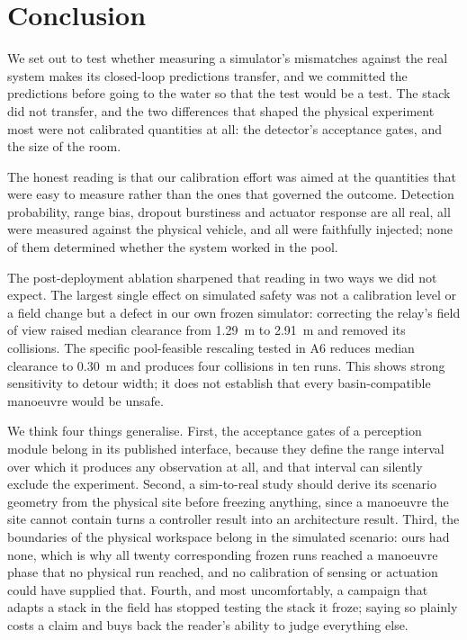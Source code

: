 \section{Conclusion}
\label{sec:conclusion}

We set out to test whether measuring a simulator's mismatches against the
real system makes its closed-loop predictions transfer, and we committed
the predictions before going to the water so that the test would be a
test. The stack did not transfer, and the two differences that shaped the
physical experiment most were not calibrated quantities at all: the
detector's acceptance gates, and the size of the room.

The honest reading is that our calibration effort was aimed at the
quantities that were easy to measure rather than the ones that governed
the outcome. Detection probability, range bias, dropout burstiness and
actuator response are all real, all were measured against the physical
vehicle, and all were faithfully injected; none of them determined
whether the system worked in the pool.

The post-deployment ablation sharpened that reading in two ways we did
not expect. The largest single effect on simulated safety was not a
calibration level or a field change but a defect in our own frozen
simulator: correcting the relay's field of view raised median clearance
from \SI{1.29}{\metre} to \SI{2.91}{\metre} and removed its collisions.
The specific pool-feasible rescaling tested in A6 reduces median
clearance to \SI{0.30}{\metre} and produces four collisions in ten runs.
This shows strong sensitivity to detour width; it does not establish
that every basin-compatible manoeuvre would be unsafe.

We think four things generalise. First, the acceptance gates of a
perception module belong in its published interface, because they define
the range interval over which it produces any observation at all, and
that interval can silently exclude the experiment. Second, a sim-to-real
study should derive its scenario geometry from the physical site before
freezing anything, since a manoeuvre the site cannot contain turns a
controller result into an architecture result. Third, the boundaries of
the physical workspace belong in the simulated scenario: ours had none,
which is why all twenty corresponding frozen runs reached a manoeuvre
phase that no physical run reached, and no calibration of sensing or
actuation could have supplied that. Fourth, and most uncomfortably, a
campaign that adapts a stack in the field has stopped testing the stack it froze; saying so
plainly costs a claim and buys back the reader's ability to judge
everything else.

